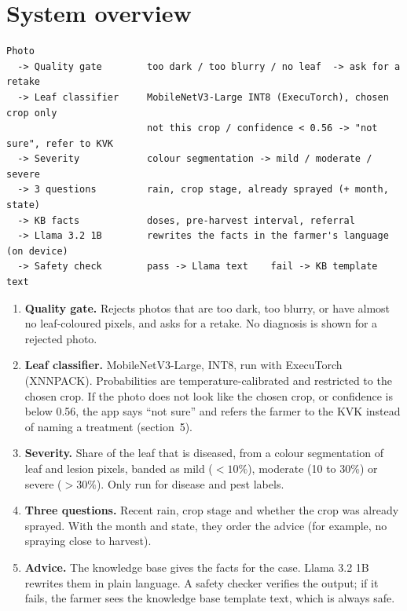 \documentclass[11pt,a4paper]{article}
\begin{document}
\section{System overview}

\begin{Verbatim}[fontsize=\footnotesize,frame=single,framesep=6pt,rulecolor=\color{gray}]
Photo
  -> Quality gate        too dark / too blurry / no leaf  -> ask for a retake
  -> Leaf classifier     MobileNetV3-Large INT8 (ExecuTorch), chosen crop only
                         not this crop / confidence < 0.56 -> "not sure", refer to KVK
  -> Severity            colour segmentation -> mild / moderate / severe
  -> 3 questions         rain, crop stage, already sprayed (+ month, state)
  -> KB facts            doses, pre-harvest interval, referral
  -> Llama 3.2 1B        rewrites the facts in the farmer's language (on device)
  -> Safety check        pass -> Llama text    fail -> KB template text
\end{Verbatim}

\begin{enumerate}
  \item \textbf{Quality gate.} Rejects photos that are too dark, too blurry, or
        have almost no leaf-coloured pixels, and asks for a retake. No diagnosis
        is shown for a rejected photo.
  \item \textbf{Leaf classifier.} MobileNetV3-Large, INT8, run with ExecuTorch
        (XNNPACK). Probabilities are temperature-calibrated and restricted to the
        chosen crop. If the photo does not look like the chosen crop, or
        confidence is below 0.56, the app says ``not sure'' and refers the farmer
        to the KVK instead of naming a treatment (section~5).
  \item \textbf{Severity.} Share of the leaf that is diseased, from a colour
        segmentation of leaf and lesion pixels, banded as mild ($<10\%$),
        moderate (10 to 30\%) or severe ($>30\%$). Only run for disease and pest labels.
  \item \textbf{Three questions.} Recent rain, crop stage and whether the crop was
        already sprayed. With the month and state, they order the advice (for
        example, no spraying close to harvest).
  \item \textbf{Advice.} The knowledge base gives the facts for the case. Llama
        3.2 1B rewrites them in plain language. A safety checker verifies the
        output; if it fails, the farmer sees the knowledge base template text,
        which is always safe.
\end{enumerate}
\end{document}
